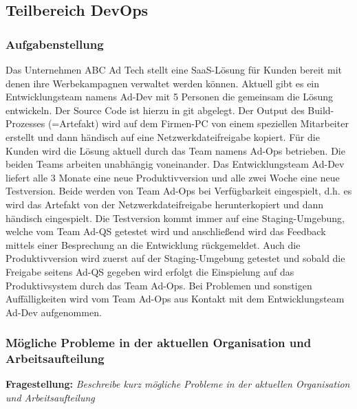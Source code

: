 \subsection{Teilbereich DevOps}

\subsubsection{Aufgabenstellung}

Das Unternehmen ABC Ad Tech stellt eine SaaS-Lösung für Kunden bereit mit denen ihre
Werbekampagnen verwaltet werden können.
Aktuell gibt es ein Entwicklungsteam namens  Ad-Dev  mit 5 Personen die gemeinsam die
Lösung entwickeln. Der Source Code ist hierzu in git abgelegt. Der Output des Build-Prozesses
(=Artefakt) wird auf dem Firmen-PC von einem speziellen Mitarbeiter erstellt und dann
händisch auf eine Netzwerkdateifreigabe kopiert.
Für die Kunden wird die Lösung aktuell durch das Team namens Ad-Ops betrieben.
Die beiden Teams arbeiten unabhängig voneinander.
Das Entwicklungsteam Ad-Dev liefert alle 3 Monate eine neue Produktivversion und alle
zwei Woche eine neue Testversion. Beide werden von Team Ad-Ops bei Verfügbarkeit
eingespielt, d.h. es wird das Artefakt von der Netzwerkdateifreigabe herunterkopiert und dann
händisch eingespielt. Die Testversion kommt immer auf eine Staging-Umgebung, welche
vom Team Ad-QS getestet wird und anschließend wird das Feedback mittels einer
Besprechung an die Entwicklung rückgemeldet. Auch die Produktivversion wird zuerst auf der
Staging-Umgebung getestet und sobald die Freigabe seitens  Ad-QS  gegeben wird erfolgt die
Einspielung auf das Produktivsystem durch das Team Ad-Ops. Bei Problemen und sonstigen
Auffälligkeiten wird vom Team  Ad-Ops  aus Kontakt mit dem Entwicklungsteam  Ad-Dev 
aufgenommen.\\


\subsubsection{Mögliche Probleme in der aktuellen Organisation und Arbeitsaufteilung}

\textbf{Fragestellung:} \textit{Beschreibe kurz mögliche Probleme in der aktuellen Organisation und Arbeitsaufteilung}
    

